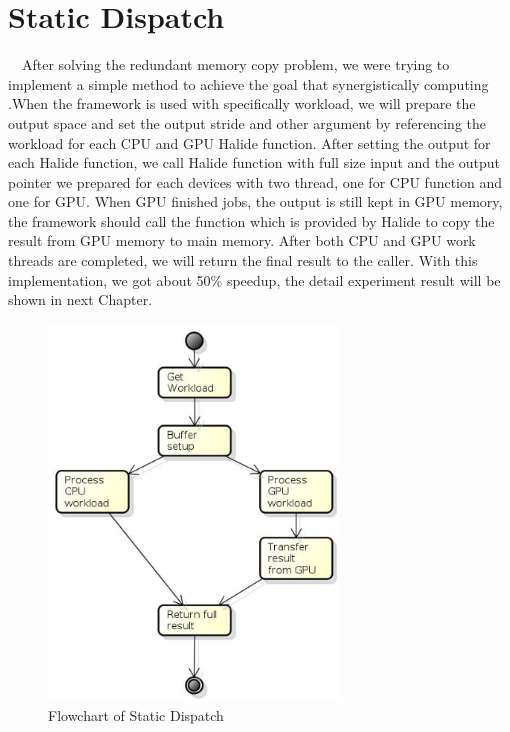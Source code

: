 \section{Static Dispatch}
\quad\ \ After solving the redundant memory copy problem, we were trying to implement a simple method to achieve the goal that synergistically computing .When the framework is used with specifically workload, we will prepare the output space and set the output stride and other argument by referencing the workload for each CPU and GPU Halide function.  After setting the output for each Halide function, we call Halide function with full size input and the output pointer we prepared for each devices with two thread, one for CPU function and one for GPU. When GPU finished jobs, the output is still kept in GPU memory, the framework should call the function which is provided by Halide to copy the result from GPU memory to main memory. After both CPU and GPU work threads are completed, we will return the final result to the caller. With this implementation, we got about 50\% speedup, the detail experiment result will be shown in next Chapter.


\begin{figure}[H]
\centering
\includegraphics[height=10cm]{img/StaticDispatch.png}
\caption{Flowchart of Static Dispatch}
\label{fig:my_label}
\end{figure}

